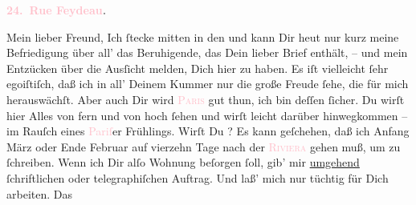            \pstart
           \begin{otherlanguage}{french}\textcolor{gray}{\textbf{\textbf{\textcolor{pink}{24. Rue Feydeau}{}\ledrightnote{\textcolor{pink}{rue Feydeau}}.}}}\end{otherlanguage}\pend
           \pstart\center{}Mein lieber Freund,\pend\pstart
           Ich ſtecke mitten in den \label{K_L02803-1v}\label{K_L02803-1h} und kann Dir heut nur kurz
               meine Befriedigung über all’ das Beruhigende, das Dein lieber Brief enthält, – und
               mein Entzücken über die Ausſicht melden, Dich hier zu haben. Es iſt vielleicht ſehr
               egoiſtiſch, daß ich in all’ Deinem Kummer nur die große Freude ſehe, die für mich
               herauswächſt. Aber auch Dir wird \textsc{\textcolor{pink}{Paris}{}\ledrightnote{\textcolor{pink}{Paris}}} gut thun, ich bin deſſen ſicher. {\pb}Du wirſt
               hier Alles von fern und von hoch ſehen und wirſt leicht darüber hinwegkommen – im
               Rauſch eines \textcolor{pink}{Pariſ}{}\ledrightnote{\textcolor{pink}{Paris}}er Frühlings.\pend
           \pstart
           Wirſt Du \label{K_L02803-2v}\label{K_L02803-2h}? Es kann geſchehen, daß ich
               Anfang März oder Ende Februar
               auf vierzehn Tage nach der \textsc{\textcolor{pink}{Riviera}{}\ledrightnote{\textcolor{pink}{Riviera}}} gehen muß, um \label{K_L02803-3v}\label{K_L02803-3h} zu ſchreiben. Wenn ich Dir alſo Wohnung beſorgen ſoll, gib’ mir \uline{umgehend} ſchriftlichen oder telegraphiſchen Auftrag.
               Und laß’ mich nur tüchtig für Dich arbeiten. {\pb}Das
